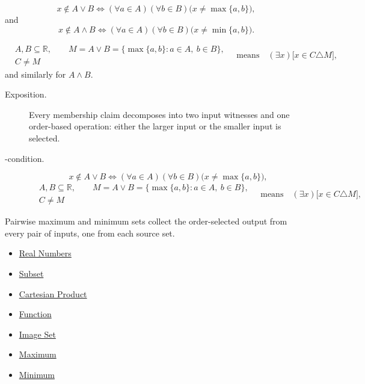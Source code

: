 \begin{remark*}
\[
x\notin A\vee B
\Longleftrightarrow
(\forall a\in A)(\forall b\in B)\bigl(x\neq\max\{a,b\}\bigr),
\]
and
\[
x\notin A\wedge B
\Longleftrightarrow
(\forall a\in A)(\forall b\in B)\bigl(x\neq\min\{a,b\}\bigr).
\]
\end{remark*}

\begin{remark*}
\[
\begin{aligned}
&A,B\subseteq\mathbb{R},\qquad
M=A\vee B=\{\max\{a,b\}:a\in A,\ b\in B\},\\
&C\ne M
\end{aligned}
\quad\text{means}\quad
(\exists x)\bigl[x\in C\triangle M\bigr],
\]
and similarly for $A\wedge B$.
\end{remark*}

\begin{remark*}
\begin{description}
\item[Exposition.]
Every membership claim decomposes into two input witnesses and one order-based
operation: either the larger input or the smaller input is selected.


  \item[\exists-condition.]
  \[
x\notin A\vee B
\Longleftrightarrow
(\forall a\in A)(\forall b\in B)\bigl(x\neq\max\{a,b\}\bigr),
\]
\[
\begin{aligned}
&A,B\subseteq\mathbb{R},\qquad
M=A\vee B=\{\max\{a,b\}:a\in A,\ b\in B\},\\
&C\ne M
\end{aligned}
\quad\text{means}\quad
(\exists x)\bigl[x\in C\triangle M\bigr],
\]
\end{description}
\end{remark*}

\begin{remark*}[Interpretation]
Pairwise maximum and minimum sets collect the order-selected output from
every pair of inputs, one from each source set.
\end{remark*}

\begin{dependencies}
\begin{itemize}
  \item \hyperref[def:reals]{Real Numbers}
  \item \hyperref[def:subset]{Subset}
  \item \hyperref[def:cartesian-product]{Cartesian Product}
  \item \hyperref[def:function]{Function}
  \item \hyperref[def:image-set]{Image Set}
  \item \hyperref[def:maximum]{Maximum}
  \item \hyperref[def:minimum]{Minimum}
\end{itemize}
\end{dependencies}

